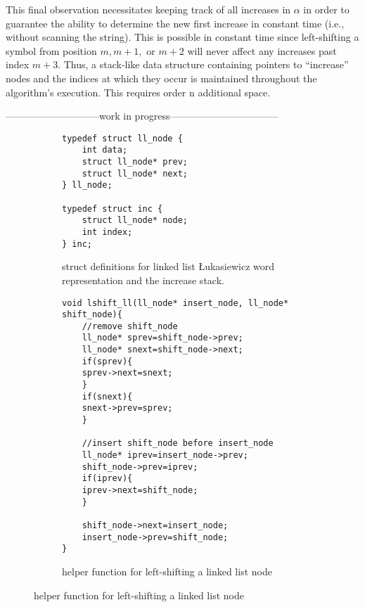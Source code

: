 This final observation necessitates keeping track of all increases in $\alpha$ in order to guarantee the ability to determine the new first increase in constant time (i.e., without scanning the string).  This is possible in constant time since left-shifting a symbol from position $m,m+1,$ or $m+2$ will never affect any increases past index $m+3$.  Thus, a stack-like data structure containing pointers to ``increase'' nodes and the indices at which they occur is maintained throughout the algorithm's execution.  This requires order n additional space.

-----------------------------work in progress---------------------------------
    
\begin{figure}[H]
    \begin{subfigure}[]{.5\textwidth}
    \begin{center}
        \begin{Verbatim}
typedef struct ll_node {
    int data;
    struct ll_node* prev;
    struct ll_node* next;
} ll_node;

typedef struct inc {
    struct ll_node* node;
    int index;
} inc;
        \end{Verbatim}
            
    \end{center}

    \caption{struct definitions for linked list Łukasiewicz word representation and the increase stack.}
    \label{fig:lukaStruct}
    \end{subfigure}
    \begin{subfigure}[]{.5\textwidth}
    \begin{center}
        \begin{Verbatim}
void lshift_ll(ll_node* insert_node, ll_node* shift_node){
    //remove shift_node
    ll_node* sprev=shift_node->prev;
    ll_node* snext=shift_node->next;
    if(sprev){
	sprev->next=snext;
    }
    if(snext){
	snext->prev=sprev;
    }

    //insert shift_node before insert_node
    ll_node* iprev=insert_node->prev;
    shift_node->prev=iprev;
    if(iprev){
	iprev->next=shift_node;
    }

    shift_node->next=insert_node;
    insert_node->prev=shift_node;
}

        \end{Verbatim}
            
    \end{center}

\caption{helper function for left-shifting a linked list node}
    \label{fig:lukaHelpers}
    \end{subfigure}

\end{figure}


